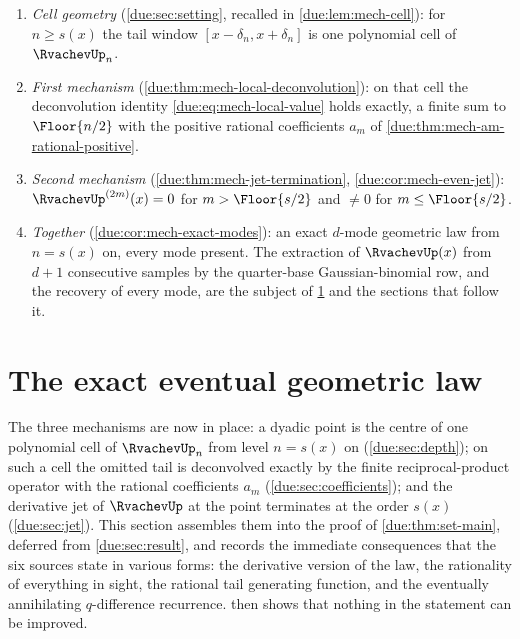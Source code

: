 \documentclass[11pt,oneside]{article}
\theoremstyle{plain}
\theoremstyle{definition}
\theoremstyle{remark}
\newcommand{\upn}[1]{\RvachevUp_{#1}}
\newcommand{\dep}[1]{s\!\left(#1\right)}                    %
\newcommand{\am}[1]{a_{#1}}                                 %
\begin{document}
\begin{checkpointbox}[title={The shape of the argument so far}]
\begin{enumerate}
\item \emph{Cell geometry} (\cref{due:sec:setting}, recalled in
\cref{due:lem:mech-cell}): for \(n\ge\dep{x}\) the tail window
\([x-\delta_n,x+\delta_n]\) is one polynomial cell of \(\upn{n}\).
\item \emph{First mechanism} (\cref{due:thm:mech-local-deconvolution}):
on that cell the deconvolution identity \cref{due:eq:mech-local-value}
holds exactly, a finite sum to \(\Floor{n/2}\) with the positive rational
coefficients \(\am{m}\) of \cref{due:thm:mech-am-rational-positive}.
\item \emph{Second mechanism} (\cref{due:thm:mech-jet-termination},
\cref{due:cor:mech-even-jet}): \(\RvachevUp^{(2m)}(x)=0\) for \(m>\Floor{s/2}\)
and \(\ne0\) for \(m\le\Floor{s/2}\).
\item \emph{Together} (\cref{due:cor:mech-exact-modes}): an exact
\(d\)-mode geometric law from \(n=\dep{x}\) on, every mode present.  The
extraction of \(\RvachevUp(x)\) from \(d+1\) consecutive samples by the
quarter-base Gaussian-binomial row, and the recovery of every mode, are the
subject of \cref{due:sec:main} and the sections that follow it.
\end{enumerate}
\end{checkpointbox}


\section{The exact eventual geometric law}
\label{due:sec:main}

The three mechanisms are now in place: a dyadic point is the centre of one
polynomial cell of $\upn{n}$ from level $n=\dep{x}$ on
(\cref{due:sec:depth}); on such a cell the omitted tail is deconvolved
exactly by the finite reciprocal-product operator with the rational
coefficients $\am{m}$ (\cref{due:sec:coefficients}); and the derivative jet
of $\RvachevUp$ at the point terminates at the order $\dep{x}$
(\cref{due:sec:jet}).  This section assembles them into the proof of
\cref{due:thm:set-main}, deferred from \cref{due:sec:result}, and records
the immediate consequences that the six sources state in various forms: the
derivative version of the law, the rationality of everything in sight, the
rational tail generating function, and the eventually annihilating
$q$-difference recurrence.   then shows that
nothing in the statement can be improved.
\end{document}
